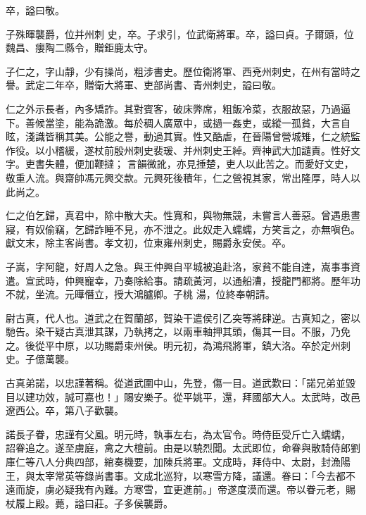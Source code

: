 \begin{pinyinscope}
 卒，謚曰敬。



 子殊暉襲爵，位并州刺
 史，卒。子求引，位武衛將軍。卒，謚曰貞。子爾頭，位魏昌、癭陶二縣令，贈鉅鹿太守。



 子仁之，字山靜，少有操尚，粗涉書史。歷位衛將軍、西兗州刺史，在州有當時之譽。武定二年卒，贈衛大將軍、吏部尚書、青州刺史，謚曰敬。



 仁之外示長者，內多矯詐。其對賓客，破床弊席，粗飯冷菜，衣服故惡，乃過逼下。善候當塗，能為詭激。每於稠人廣眾中，或撾一姦吏，或縱一孤貧，大言自眩，淺識皆稱其美。公能之譽，動過其實。性又酷虐，在晉陽曾營城雉，仁之統監作役。以小稽緩，遂杖前殷州刺史裴瑗、并州刺史王綽。齊神武大加譴責。性好文字。吏書失體，便加鞭撻；
 言韻微訛，亦見捶楚，吏人以此苦之。而愛好文史，敬重人流。與齋帥馮元興交款。元興死後積年，仁之營視其家，常出隆厚，時人以此尚之。



 仁之伯乞歸，真君中，除中散大夫。性寬和，與物無競，未嘗言人善惡。曾遇患晝寢，有奴偷竊，乞歸詐睡不見，亦不泄之。此奴走入蠕蠕，方笑言之，亦無嗔色。獻文末，除主客尚書。孝文初，位東雍州刺史，賜爵永安侯。卒。



 子嵩，字阿龍，好周人之急。與王仲興自平城被追赴洛，家貧不能自達，嵩事事資遣。宣武時，仲興寵幸，乃奏除給事。請疏黃河，以通船漕，授龍門都將。歷年功不就，坐流。元曄僭立，授大鴻臚卿。子桃
 湯，位終奉朝請。



 尉古真，代人也。道武之在賀蘭部，賀染干遣侯引乙突等將肆逆。古真知之，密以馳告。染干疑古真泄其謀，乃執拷之，以兩車軸押其頭，傷其一目。不服，乃免之。後從平中原，以功賜爵束州侯。明元初，為鴻飛將軍，鎮大洛。卒於定州刺史。子億萬襲。



 古真弟諾，以忠謹著稱。從道武圍中山，先登，傷一目。道武歎曰：「諾兄弟並毀目以建功效，誠可嘉也！」賜安樂子。從平姚平，還，拜國部大人。太武時，改邑遼西公。卒，第八子歡襲。



 諾長子眷，忠謹有父風。明元時，執事左右，為太官令。時侍臣受斤亡入蠕蠕，
 詔眷追之。遂至虜庭，禽之大檀前。由是以驍烈聞。太武即位，命眷與散騎侍郎劉庫仁等八人分典四部，綰奏機要，加陳兵將軍。文成時，拜侍中、太尉，封漁陽王，與太宰常英等錄尚書事。文成北巡狩，以寒雪方降，議還。眷曰：「今去都不遠而旋，虜必疑我有內難。方寒雪，宜更進前。」帝遂度漠而還。帝以眷元老，賜杖履上殿。薨，謚曰莊。子多侯襲爵。




\end{pinyinscope}
